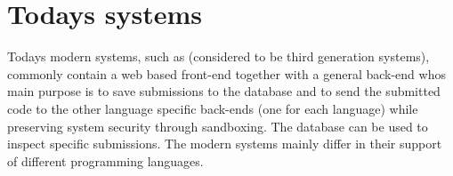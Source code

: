 \section{Todays systems} \label{sec:todays_systems}
Todays modern systems, such as \cite{Gradebot} \cite{GenerationReview}  \cite{Kattis} \cite{Amelung} (considered to be third generation systems), commonly contain a web based front-end together with a general back-end whos main purpose is to save submissions to the database and to send the submitted code to the other language specific back-ends (one for each language) while preserving system security through sandboxing. The database can be used to inspect specific submissions. The modern systems mainly differ in their support of different programming languages. 